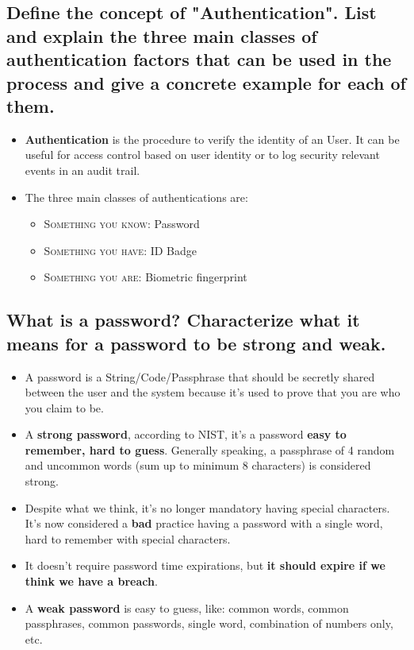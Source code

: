 \documentclass[9pt, letterpaper]{article}
\begin{document}
\subsection{Define the concept of "Authentication". List and explain the three main classes of authentication factors that can be used in the process and give a concrete example for each of them.}
\begin{itemize}
	\item \textbf{Authentication} is the procedure to verify the identity of an User. It can be useful for access control based on user identity or to log security relevant events in an audit trail.
	\item The three main classes of authentications are:
	      \begin{itemize}
		      \item \textsc{Something you know}: Password
		      \item \textsc{Something you have}: ID Badge
		      \item \textsc{Something you are}: Biometric fingerprint
	      \end{itemize}
\end{itemize}

\subsection{What is a password? Characterize what it means for a password to be strong and weak.}
\begin{itemize}
	\item A password is a String/Code/Passphrase that should be secretly shared between the user and the system because it's used to prove that you are who you claim to be.
	\item A \textbf{strong password}, according to NIST, it's a password \textbf{easy to remember, hard to guess}. Generally speaking, a passphrase of 4 random and uncommon words (sum up to minimum 8 characters) is considered strong.
	\item Despite what we think, it's no longer mandatory having special characters. It's now considered a \textbf{bad} practice having a password with a single word, hard to remember with special characters.
	\item It doesn't require password time expirations, but \textbf{it should expire if we think we have a breach}.
	\item A \textbf{weak password} is easy to guess, like: common words, common passphrases, common passwords, single word, combination of numbers only, etc.
\end{itemize}
\end{document}
